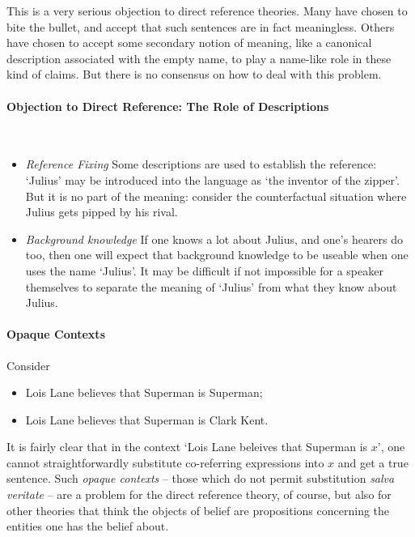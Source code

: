 This is a very serious objection to direct reference theories. Many have chosen to bite the bullet, and accept that such sentences are in fact meaningless. Others have chosen to accept some secondary notion of meaning, like a canonical description associated with the empty name, to play a name-like role in these kind of claims. But there is no consensus on how to deal with this problem.

\paragraph{Objection to Direct Reference: The Role of Descriptions}

~
\begin{itemize}
	\item \emph{Reference Fixing} Some descriptions are used to establish the reference: `Julius' may be introduced into the language as `the inventor of the zipper'. But it is no part of the meaning: consider the counterfactual situation where Julius gets pipped by his rival.
	\item \emph{Background knowledge} If one knows a lot about Julius, and one's hearers do too, then one will expect that background knowledge to be useable when one uses the name `Julius'. It may be difficult if not impossible for a speaker themselves to separate the meaning of `Julius' from what they know about Julius.
\end{itemize}

\paragraph{Opaque Contexts}

 Consider \begin{itemize}
	\item Lois Lane believes that Superman is Superman;
	\item Lois Lane believes that Superman is Clark Kent.
\end{itemize}
It is fairly clear that in the context `Lois Lane beleives that Superman is $x$', one cannot straightforwardly substitute co-referring expressions into $x$ and get a true sentence. Such \emph{opaque contexts} – those which do not permit substitution \emph{salva veritate} – are a problem for the direct reference theory, of course, but also for other theories that think the objects of belief are propositions concerning the entities one has the belief about. 

